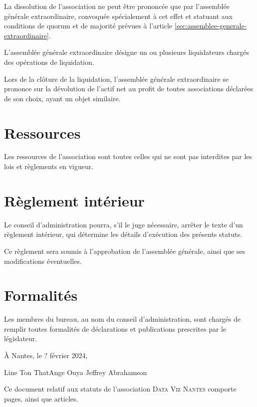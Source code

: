 \documentclass[12 pt]{article}
\newcommand{\quand}{? février 2024}
\newcommand{\Nom}{\textsc{Data Viz Nantes}}
\begin{document}
La dissolution de l'association ne peut être prononcée que par
l'assemblée générale extraordinaire, convoquée spécialement à cet
effet et statuant aux conditions de quorum et de majorité prévues à
l'article \ref{sec:assemblee-generale-extraordinaire}.

L'assemblée générale extraordinaire désigne un ou plusieurs
liquidateurs chargés des opérations de liquidation.

Lors de la clôture de la liquidation, l'assemblée générale
extraordinaire se prononce sur la dévolution de l'actif net au profit
de toutes associations déclarées de son choix, ayant un objet
similaire.

\section{Ressources}
\label{sec:ressources}

Les ressources de l'association sont toutes celles qui ne sont pas
interdites par les lois et règlements en vigueur.

\section{Règlement intérieur}
\label{sec:reglement-interieur}

Le conseil d'administration pourra, s'il le juge nécessaire, arrêter
le texte d'un règlement intérieur, qui détermine les détails
d'exécution des présents statuts.

Ce règlement sera soumis à l'approbation de l'assemblée générale,
ainsi que ses modifications éventuelles.

\section{Formalités}
\label{sec:formalites}

Les membres du bureau, au nom du conseil d'administration, sont
chargés de remplir toutes formalités de déclarations et publications
prescrites par le législateur.

\vfill{}

\begin{flushright}
  À Nantes, le \quand{},
\end{flushright}

\vspace{10mm}

\hfile{}Line Ton That\hfill{}Ange Ouya \hspace{4cm} Jeffrey Abrahamson\hfill{}

\vspace{15mm}

Ce document relatif aux statuts de l'association \Nom{} comporte
\pageref{LastPage} pages, ainsi que  articles.

\vfill{}

\end{document}
